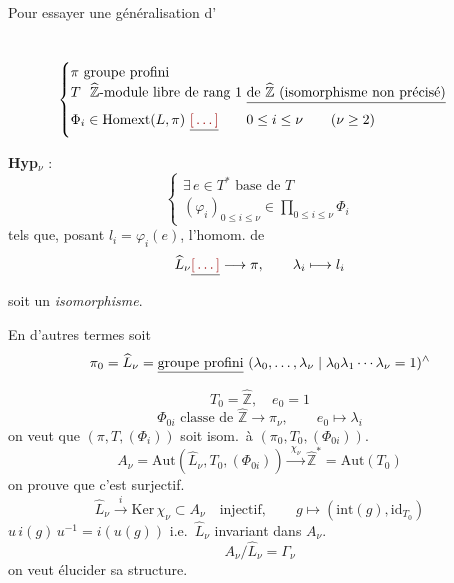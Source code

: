 \documentclass[11pt,a4paper]{article}
\begin{document}
Pour essayer une généralisation d'

\section{}

\[
  \begin{cases}
    \pi \ \text{groupe profini}\\
    T\ \ \widehat{\mathbb{Z}}\text{-module libre de rang } 1
      \ \struck{\text{de } \widehat{\mathbb{Z}}\ (\text{isomorphisme non précisé})}\\
    \Phi_{i} \in \mathrm{Homext}(L, \pi)\ \struck{\ill{}}
      \qquad 0 \le i \le \nu \qquad (\nu \ge 2)
  \end{cases}
\]

\textbf{Hyp}$_{\nu}$ :
\[
  \begin{cases}
    \exists\, e \in T^{*} \text{ base de } T\\
    (\varphi_{i})_{0 \le i \le \nu} \in \prod_{0 \le i \le \nu} \Phi_{i}
  \end{cases}
\]
tels que, posant $l_{i} = \varphi_{i}(e)$, l'homom. de
\[
  \widehat{L}_{\nu} \struck{\ill{}} \longrightarrow \pi,\qquad
  \lambda_{i} \longmapsto l_{i}
\]
soit un \emph{isomorphisme}.

En d'autres termes soit
\[
  \pi_{0} = \widehat{L}_{\nu} = \struck{\text{groupe profini}}\
  (\lambda_{0}, \dots, \lambda_{\nu} \mid \lambda_{0}\lambda_{1}\cdots\lambda_{\nu} = 1)^{\wedge}
\]
\[
  T_{0} = \widehat{\mathbb{Z}},\quad e_{0} = 1
\]
\[
  \Phi_{0i} \text{ classe de } \widehat{\mathbb{Z}} \longrightarrow \pi_{\nu},
  \qquad e_{0} \longmapsto \lambda_{i}
\]
on veut que $(\pi, T, (\Phi_{i}))$ soit isom.\ à
$(\pi_{0}, T_{0}, (\Phi_{0i}))$.
\[
  A_{\nu} = \mathrm{Aut}(\widehat{L}_{\nu}, T_{0}, (\Phi_{0i}))
  \xrightarrow{\ \chi_{\nu}\ } \widehat{\mathbb{Z}}^{*} = \mathrm{Aut}(T_{0})
\]
on prouve que c'est surjectif.
\[
  \widehat{L}_{\nu} \xrightarrow{\ i\ } \mathrm{Ker}\,\chi_{\nu} \subset A_{\nu}
  \quad\text{injectif},\qquad
  g \longmapsto (\mathrm{int}(g), \mathrm{id}_{T_{0}})
\]
$u\, i(g)\, u^{-1} = i(u(g))$ i.e.\ $\widehat{L}_{\nu}$ invariant dans
$A_{\nu}$.
\[
  A_{\nu}/\widehat{L}_{\nu} = \Gamma_{\nu}
\]
on veut élucider sa structure.
\end{document}

